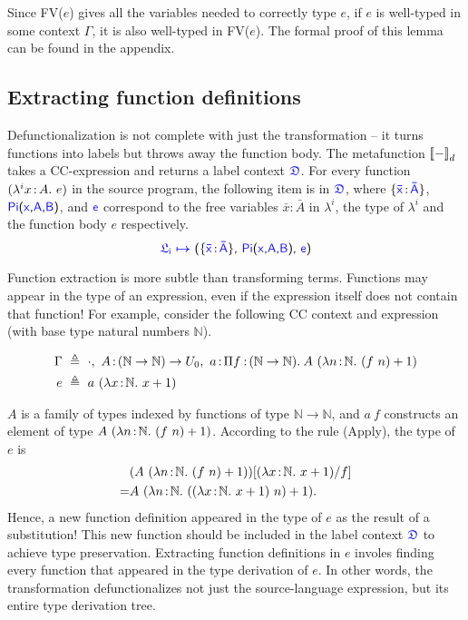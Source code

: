 Since FV($e$) gives all the variables needed to correctly type $e$, if $e$ is well-typed in some context $\Gamma$, it is also well-typed in FV($e$). The formal proof of this lemma can be found in the appendix.

\subsection{Extracting function definitions}

Defunctionalization is not complete with just the transformation -- it turns functions into labels but throws away the function body. The metafunction ${[\![ - ]\!]}_d$ takes a CC-expression and returns a label context $\target{\fdef}$.
For every function $(\lambda^{i}x\hspace{0.5mm}{:}\hspace{0.5mm} A.\ e)$ in the source program, the following item is in $\target{\fdef}$, where $\{\itemtype{\bar{x}}{\bar{A}}\}$, $\targetpi{x}{A}{B}$, and $\target{e}$ correspond to the free variables $\bar{x} \mathrel{:} \bar{A}$ in $\lambda^i$, the type of $\lambda^i$ and the function body $e$ respectively.
\begin{equation*}
	\itemdef{\target{\flabel_i}}{\itemtype{\bar{x}}{\bar{A}}}{\targetpi{x}{A}{B}}{\target{e}}
\end{equation*}


Function extraction is more subtle than transforming terms. Functions may appear in the type of an expression, even if the expression itself does not contain that function! For example, consider the following CC context and expression (with base type natural numbers $\mathbb{N}$).

\begin{align*}
	\Gamma\ & \triangleq\ \cdot,\ A \goodcolon (\mathbb{N} \rightarrow \mathbb{N}) \rightarrow U_0,\ 
	a \goodcolon \pitype{f}{(\mathbb{N} \rightarrow \mathbb{N})}{A\ (\lam{n}{\mathbb{N}}{(f\ n) + 1})} \\
	e\ & \triangleq\ a\ (\lam{x}{\mathbb{N}}{x+1})
\end{align*}

$A$ is a family of types indexed by functions of type $\mathbb{N} \rightarrow \mathbb{N}$, and $a\ f$ constructs an element of type $A\ (\lam{n}{\mathbb{N}}{(f\ n) + 1})$. According to the rule (Apply), the type of $e$ is 
\begin{align*}
	& (A\ (\lambda n\hspace{0.5mm}{:}\hspace{0.5mm}\mathbb{N}.\ (f\ n) + 1))[(\lambda x\hspace{0.5mm}{:}\hspace{0.5mm}\mathbb{N}.\ x+1)\slash f]\\
	=& A\ (\lambda n\hspace{0.5mm}{:}\hspace{0.5mm}\mathbb{N}.\ ((\lambda x\hspace{0.5mm}{:}\hspace{0.5mm}\mathbb{N}.\ x+1)\ n) + 1).
\end{align*}
Hence, a new function definition appeared in the type of $e$ as the result of a substitution! This new function should be included in the label context $\target{\fdef}$ to achieve type preservation. Extracting function definitions in $e$ involes finding every function that appeared in the type derivation of $e$. In other words, the transformation defunctionalizes not just the source-language expression, but its entire type derivation tree.

